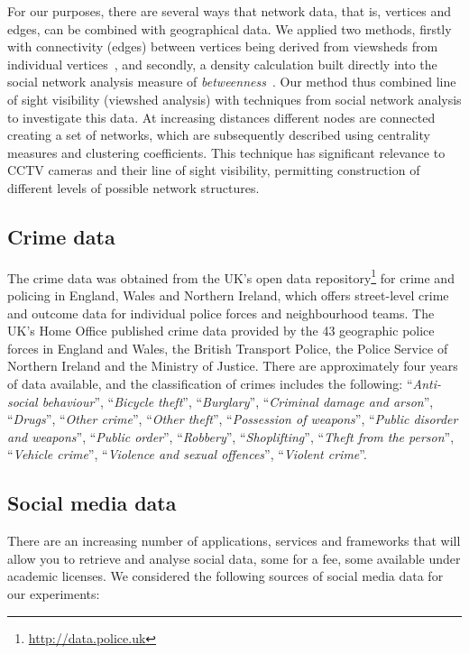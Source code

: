 \documentclass[conference]{IEEEtran}
\begin{document}
For our purposes, there are several ways that network data, that is,
vertices and edges, can be combined with geographical data. We applied
two methods, firstly with connectivity (edges) between vertices being
derived from viewsheds from individual vertices~\cite{gisruk:2015},
and secondly, a density calculation built directly into the social
network analysis measure of
\emph{betweenness}~\cite{oatley-et-al:2006a}. Our method thus combined
line of sight visibility (viewshed analysis) with techniques from
social network analysis to investigate this data. At increasing
distances different nodes are connected creating a set of networks,
which are subsequently described using centrality measures and
clustering coefficients. This technique has significant relevance to
CCTV cameras and their line of sight visibility, permitting
construction of different levels of possible network structures.

\subsection{Crime data}

The crime data was obtained from the UK's open data
repository\footnote{\url{http://data.police.uk}} for crime and
policing in England, Wales and Northern Ireland, which offers
street-level crime and outcome data for individual police forces and
neighbourhood teams. The UK’s Home Office published crime data
provided by the 43 geographic police forces in England and Wales, the
British Transport Police, the Police Service of Northern Ireland and
the Ministry of Justice. There are approximately four years of data
available, and the classification of crimes includes the following:
``{\emph{Anti-social behaviour}}'', ``{\emph{Bicycle theft}}'',
``{\emph{Burglary}}'', ``{\emph{Criminal damage and arson}}'',
``{\emph{Drugs}}'', ``{\emph{Other crime}}'', ``{\emph{Other
theft}}'', ``{\emph{Possession of weapons}}'', ``{\emph{Public
disorder and weapons}}'', ``{\emph{Public order}}'',
``{\emph{Robbery}}'', ``{\emph{Shoplifting}}'', ``{\emph{Theft from
the person}}'', ``{\emph{Vehicle crime}}'', ``{\emph{Violence and
sexual offences}}'', ``{\emph{Violent crime}}''.

\subsection{Social media data}

There are an increasing number of applications, services and
frameworks that will allow you to retrieve and analyse social data,
some for a fee, some available under academic licenses. We considered
the following sources of social media data for our
experiments:
\end{document}
